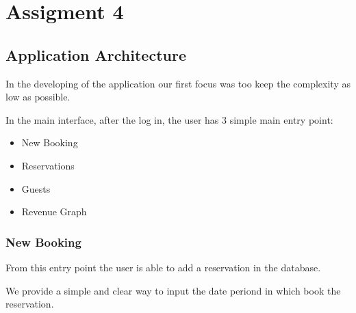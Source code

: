 \section{Assigment 4}

\graphicspath{ {./img_presentation_4/} }

\setlength{\fboxsep}{15pt}
\setlength{\fboxrule}{0pt}

\subsection{Application Architecture}

In the developing of the application our first focus was too keep the complexity as low as possible.

In the main interface, after the log in, the user has 3 simple main entry point:

\begin{itemize}
  \item New Booking
  \item Reservations
  \item Guests
  \item Revenue Graph
\end{itemize}

\subsubsection{New Booking}

From this entry point the user is able to add a reservation in the database.

We provide a simple and clear way to input the date periond in which book the reservation.


